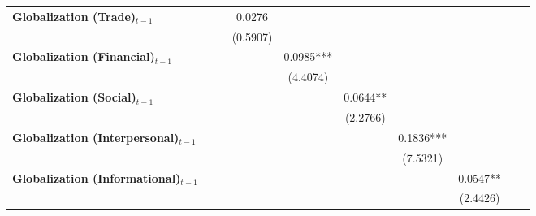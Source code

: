 \begin{center}
\begin{tabular}{lccccccccc}
\textbf{Globalization (Trade)$_{t-1}$}             &                    &                    &       0.0276       &                    &                    &                    &                    &                    &                     \\
\textbf{ }                         &                    &                    &      (0.5907)      &                    &                    &                    &                    &                    &                     \\
\textbf{Globalization (Financial)$_{t-1}$}             &                    &                    &                    &     0.0985***      &                    &                    &                    &                    &                     \\
\textbf{ }                         &                    &                    &                    &      (4.4074)      &                    &                    &                    &                    &                     \\
\textbf{Globalization (Social)$_{t-1}$}             &                    &                    &                    &                    &      0.0644**      &                    &                    &                    &                     \\
\textbf{ }                         &                    &                    &                    &                    &      (2.2766)      &                    &                    &                    &                     \\
\textbf{Globalization (Interpersonal)$_{t-1}$}             &                    &                    &                    &                    &                    &     0.1836***      &                    &                    &                     \\
\textbf{ }                         &                    &                    &                    &                    &                    &      (7.5321)      &                    &                    &                     \\
\textbf{Globalization (Informational)$_{t-1}$}             &                    &                    &                    &                    &                    &                    &      0.0547**      &                    &                     \\
\textbf{ }                         &                    &                    &                    &                    &                    &                    &      (2.4426)      &                    &                     \\

\end{tabular}
\end{center}

